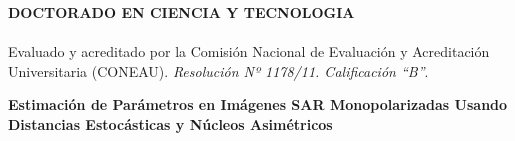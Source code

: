 \begin{titlepage}
\vspace{-4cm}
\begin{center}
	\textbf{DOCTORADO EN CIENCIA Y TECNOLOGIA}\vspace{-3mm}\\
	\hrulefill\\
	{\small Evaluado y acreditado por la Comisión Nacional de Evaluación y Acreditación Universitaria (CONEAU). \emph{Resolución Nº 1178/11. Calificación “B”}.}
\end{center}

\vspace{1cm}

\noindent\makebox[\linewidth]{\rule{15 cm}{1.5pt}}
\begin{center}
	\textbf{{\LARGE Estimación de Parámetros en Imágenes SAR Monopolarizadas Usando Distancias Estocásticas y Núcleos Asimétricos}}
\end{center}
\noindent\makebox[\linewidth]{\rule{15 cm}{1.5pt}}

\vspace{1cm}


\vspace{2.5cm}

\vspace{1cm}

\vspace{1.5cm}

\end{titlepage}




